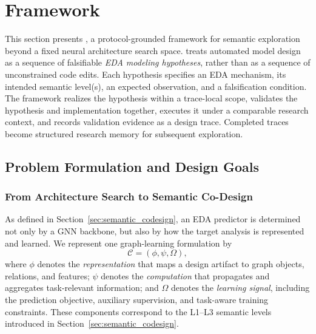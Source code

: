 \section{Framework}
\label{framework}

This section presents \sysname, a protocol-grounded framework for semantic exploration beyond a fixed neural architecture search space. \sysname treats automated model design as a sequence of falsifiable \emph{EDA modeling hypotheses}, rather than as a sequence of unconstrained code edits. Each hypothesis specifies an EDA mechanism, its intended semantic level(s), an expected observation, and a falsification condition. The framework realizes the hypothesis within a trace-local scope, validates the hypothesis and implementation together, executes it under a comparable research context, and records validation evidence as a design trace. Completed traces become structured research memory for subsequent exploration.

\subsection{Problem Formulation and Design Goals}
\label{sec:problem_formulation}

\subsubsection{From Architecture Search to Semantic Co-Design}

As defined in Section~\ref{sec:semantic_codesign}, an EDA predictor is determined not only by a GNN backbone, but also by how the target analysis is represented and learned. We represent one graph-learning formulation by
\begin{equation}
    \mathcal{C}=(\phi,\psi,\Omega),
    \label{eq:codesign_tuple}
\end{equation}
where $\phi$ denotes the \emph{representation} that maps a design artifact to graph objects, relations, and features; $\psi$ denotes the \emph{computation} that propagates and aggregates task-relevant information; and $\Omega$ denotes the \emph{learning signal}, including the prediction objective, auxiliary supervision, and task-aware training constraints. These components correspond to the L1--L3 semantic levels introduced in Section~\ref{sec:semantic_codesign}.

